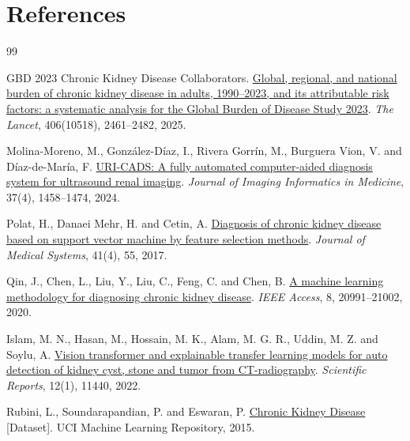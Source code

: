 \section*{References}

\begingroup
\renewcommand{\section}[2]{}
\makeatletter
\renewcommand{\@biblabel}[1]{#1.}
\makeatother

\small{}
\begin{thebibliography}{99}
\setlength{\itemsep}{1pt}

GBD 2023 Chronic Kidney Disease Collaborators.
\href{https://doi.org/10.1016/S0140-6736(25)01853-7}{Global, regional, and national burden of chronic kidney disease in adults, 1990--2023, and its attributable risk factors: a systematic analysis for the Global Burden of Disease Study 2023}.
\textit{The Lancet}, 406(10518), 2461--2482, 2025.

Molina-Moreno, M., González-Díaz, I., Rivera Gorrín, M., Burguera Vion, V. and Díaz-de-María, F.
\href{https://doi.org/10.1007/s10278-024-01055-4}{URI-CADS: A fully automated computer-aided diagnosis system for ultrasound renal imaging}.
\textit{Journal of Imaging Informatics in Medicine}, 37(4), 1458--1474, 2024.

Polat, H., Danaei Mehr, H. and Cetin, A.
\href{https://doi.org/10.1007/s10916-017-0703-x}{Diagnosis of chronic kidney disease based on support vector machine by feature selection methods}.
\textit{Journal of Medical Systems}, 41(4), 55, 2017.

Qin, J., Chen, L., Liu, Y., Liu, C., Feng, C. and Chen, B.
\href{https://doi.org/10.1109/ACCESS.2019.2963053}{A machine learning methodology for diagnosing chronic kidney disease}.
\textit{IEEE Access}, 8, 20991--21002, 2020.

Islam, M. N., Hasan, M., Hossain, M. K., Alam, M. G. R., Uddin, M. Z. and Soylu, A.
\href{https://doi.org/10.1038/s41598-022-15634-4}{Vision transformer and explainable transfer learning models for auto detection of kidney cyst, stone and tumor from CT-radiography}.
\textit{Scientific Reports}, 12(1), 11440, 2022.

Rubini, L., Soundarapandian, P. and Eswaran, P.
\href{https://doi.org/10.24432/C5G020}{Chronic Kidney Disease} [Dataset].
UCI Machine Learning Repository, 2015.


\end{thebibliography}
